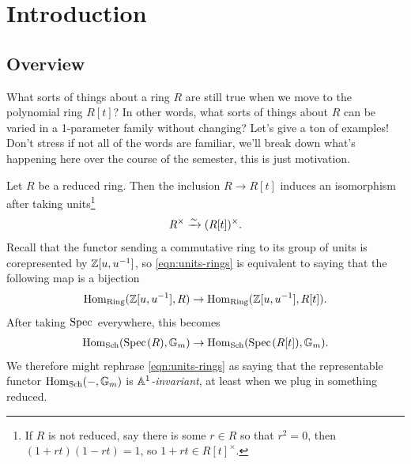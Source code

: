 \documentclass[11pt,openany]{book}
\begin{document}
\section{Introduction}

\subsection{Overview} What sorts of things about a ring $R$ are still true when we move to the polynomial ring $R[t]$? In other words, what sorts of things about $R$ can be varied in a 1-parameter family without changing? Let's give a ton of examples! Don't stress if not all of the words are familiar, we'll break down what's happening here over the course of the semester, this is just motivation.

\begin{example} Let $R$ be a reduced ring. Then the inclusion $R \to R[t]$ induces an isomorphism after taking units\footnote{If $R$ is not reduced, say there is some $r\in R$ so that $r^2 = 0$, then $(1+rt)(1-rt) = 1$, so $1+rt\in R[t]^\times$.}
\begin{equation}\label{eqn:units-rings}
\begin{aligned}
    R^\times \xrightarrow{\sim} (R[t])^\times.
\end{aligned}
\end{equation}
Recall that the functor sending a commutative ring to its group of units is corepresented by $\mathbb{Z}[u,u^{-1}]$, so \autoref{eqn:units-rings} is equivalent to saying that the following map is a bijection
\begin{align*}
    \mathrm{Hom}_{\mathrm{Ring}}(\mathbb{Z}[u,u^{-1}],R) \to \mathrm{Hom}_{\mathrm{Ring}}(\mathbb{Z}[u,u^{-1}],R[t]).
\end{align*}
After taking $\text{Spec}\hspace{0.1em}$ everywhere, this becomes
\begin{align*}
    \mathrm{Hom}_{\mathrm{Sch}}(\text{Spec}\hspace{0.1em}(R),\mathbb{G}_m) \to \mathrm{Hom}_{\mathrm{Sch}}(\text{Spec}\hspace{0.1em}(R[t]),\mathbb{G}_m).
\end{align*}
We therefore might rephrase \autoref{eqn:units-rings} as saying that the representable functor $\mathrm{Hom}_{\mathrm{Sch}}(-,\mathbb{G}_m)$ is \textit{$\mathbb{A}^1$-invariant}, at least when we plug in something reduced.
\end{example}
\end{document}
